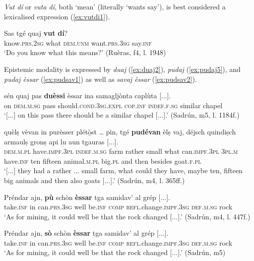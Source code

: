 \textit{Vut dí} or \textit{vuta dí}, both `mean'  (literally `wants say'), is best considered a lexicalised expression (\ref{ex:vutdi1}).

\ea
\label{ex:vutdi1}
\gll Sas tgé quaj \textbf{vut} \textbf{dí}?   \\
know.\textsc{prs.2sg} what \textsc{dem.unm} want.\textsc{prs.3sg} say.\textsc{inf}\\
\glt `Do you know what this means?' (Ruèras, f4, l. 1948)
\z

Epistemic modality is expressed by \textit{duaj}  (\ref{ex:duaj2}), \textit{pudaj} (\ref{ex:pudaj5}), and \textit{pudaj èssar} (\ref{ex:pudsav1}) as well as \textit{savaj èssar} (\ref{ex:pudsav2}).

\ea
\label{ex:duaj2}
\gll   [...] sén quaj pas \textbf{duèssi} èssar ina samagljònta caplùta [...]. \\
{} on \textsc{dem.m.sg} pass should.\textsc{cond.3sg.expl} \textsc{cop.inf} \textsc{indef.f.sg} similar chapel\\
\glt `[...] on this pass there should be a similar chapel [...].' (Sadrún, m5, l. 1184f.)
\z

\ea
\label{ex:pudaj5}
\gll   [...] quèlṣ vèvan in purèsser plétò̱st … pin, tgé \textbf{pudévan} èlṣ vaj, déjsch quindiṣch armaulṣ gronṣ api lu aun tgauras [...]. \\
{} \textsc{dem.m.pl} have.\textsc{impf.3pl} \textsc{indef.m.sg} farm rather {} small what can.\textsc{impf.3pl} \textsc{3pl.m} have.\textsc{inf} ten fifteen animal.\textsc{m.pl} big.\textsc{pl} and then besides goat.\textsc{f.pl}\\
\glt `[...] they had a rather ... small farm, what could they have, maybe ten, fifteen big animals and then also goats [...].' (Sadrún, m4, l. 365ff.)
\z

\ea
\label{ex:pudsav1}
\gll Préndar ajn, \textbf{pù} schòn \textbf{èssar} tga samidav’ al grép [...].\\
take.\textsc{inf} in can.\textsc{prs.3sg} well be.\textsc{inf}  \textsc{comp} \textsc{refl}.change.\textsc{impf.3sg} \textsc{def.m.sg} rock\\
\glt `As for mining, it could well be that the rock changed [...].' (Sadrún, m4, l. 447f.)
\z

\ea
\label{ex:pudsav2}
\gll Préndar ajn, \textbf{sò} schòn \textbf{èssar} tga samidav’ al grép [...].\\
take.\textsc{inf} in can.\textsc{prs.3sg} well be.\textsc{inf}  \textsc{comp} \textsc{refl}.change.\textsc{impf.3sg} \textsc{def.m.sg} rock\\
\glt `As for mining, it could well be that the rock changed [...].' (Sadrún, m5)
\z


